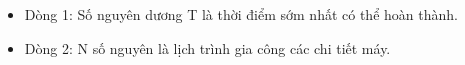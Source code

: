 \begin{itemize}
	\item     Dòng 1: Số nguyên dương T là thời điểm sớm nhất có thể hoàn thành.   
	\item     Dòng 2: N số nguyên là lịch trình gia công các chi tiết máy.   
\end{itemize}